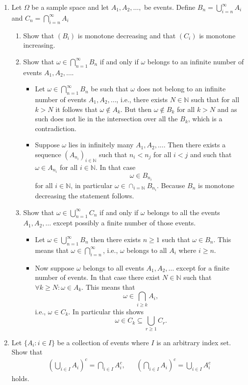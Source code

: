 \documentclass{article}
\begin{document}
\begin{enumerate}
\begin{itemize}
		\end{itemize}
	\item Let $\Omega$ be a sample space and let $A_1, A_2, \dots, $ be events. Define $B_n = \bigcup_{i = n}^\infty A_i$ and $C_n = \bigcap_{i = n}^\infty A_i$
		\begin{enumerate}
			\item Show that $(B_i)$ is monotone decreasing and that $(C_i)$ is monotone increasing.
			\item Show that $\omega \in \bigcap_{n = 1}^\infty B_n$ if and only if $\omega$ belongs to an infinite number of events $A_1, A_2, \dots$.
				\begin{itemize}
					\item Let $\omega \in \bigcap_{n = 1}^\infty B_n$ be such that $\omega$ does not belong to an infinite number of events $A_1, A_2, \dots$, i.e., there exists $N \in \mathbb{N}$ such that for all $k > N$ it follows that $\omega \notin A_k$. But then $\omega \notin B_k$ for all $k > N$ and as such does not lie in the intersection over all the $B_k$, which is a contradiction.
					\item Suppose $\omega$ lies in infinitely many $A_1, A_2, ...$. Then there exists a sequence $(A_{n_i})_{i \in \mathbb{N}}$ such that $n_i < n_{j}$ for all $i < j$ and such that $\omega \in A_{n_i}$ for all $i \in \mathbb{N}$. In that case
					$$
					\omega \in B_{n_i}
					$$
					for all $i \in \mathbb{N}$, in particular $\omega \in \cap_{i = \mathbb{N}} B_{n_i}$. Because $B_n$ is monotone decreasing the statement follows.
				\end{itemize}
			\item Show that $\omega \in \bigcup_{n = 1}^\infty C_n$ if and only if $\omega$ belongs to all the events $A_1, A_2, \dots$ except possibly a finite number of those events.
				\begin{itemize}
					\item Let $\omega \in \bigcup_{n = 1}^\infty B_n$ then there exists $n \geq 1$ such that $\omega \in B_n$. This means that $\omega \in \bigcap_{i = n}^\infty$, i.e., $\omega$ belongs to all $A_i$ where $i \geq n$.
					\item Now suppose $\omega$ belongs to all events $A_1, A_2, \dots$ except for a finite number of events. In that case there exist $N \in \mathbb{N}$ such that $\forall k \geq N : \omega \in A_k$. This means that
					$$
					\omega \in \bigcap_{i \geq k} A_i,
					$$
					i.e., $\omega \in C_k$. In particular this shows
					$$
					\omega \in C_k \subseteq \bigcup_{r \geq 1} C_r.
					$$
				\end{itemize}
		\end{enumerate}
	\item Let $\{A_i : i \in I\}$ be a collection of events where $I$ is an arbitrary index set. Show that
	$$
	\begin{aligned}
	\left( \bigcup_{i \in I} A_i \right)^c = \bigcap_{i \in I} A_i^c, && \left( \bigcap_{i \in I} A_i \right)^c = \bigcup_{i \in I} A_i^c
	\end{aligned}
	$$
	holds.


\end{enumerate}
\end{document}
